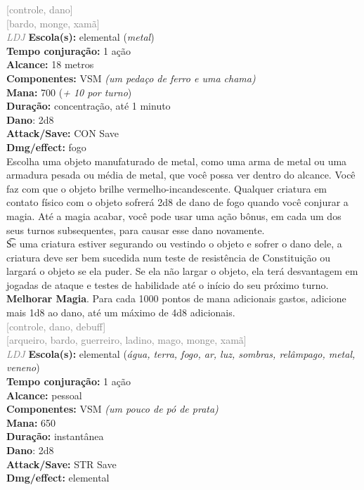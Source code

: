 \documentclass{RPG_Adventure}[2021/10/20]
\begin{document}
{\scriptsize \textcolor{gray}{[controle, dano]\\}}
{\scriptsize \textcolor{gray}{[bardo, monge, xamã]\\}}
{\tiny \textcolor{gray}{\textit{LDJ}}}\jump{}
{\small \t \textbf{Escola(s):} elemental (\textit{metal})\\\t \textbf{Tempo conjuração:} 1 ação\\\t \textbf{Alcance:} 18 metros\\\t \textbf{Componentes:} VSM \textit{(um pedaço de ferro e uma chama)}\\\t \textbf{Mana:} 700 (\textit{+ 10 por turno})\\\t \textbf{Duração:} concentração, até 1 minuto\\\t \textbf{Dano}: 2d8\\\t \textbf{Attack/Save:} CON Save\\\t \textbf{Dmg/effect:} fogo\\}
{\normalsize Escolha uma objeto manufaturado de metal, como uma arma de metal ou uma armadura pesada ou média de metal, que você possa ver dentro do alcance. Você faz com que o objeto brilhe vermelho-incandescente. Qualquer criatura em contato físico com o objeto sofrerá 2d8 de dano de fogo quando você conjurar a magia. Até a magia acabar, você pode usar uma ação bônus, em cada um dos seus turnos subsequentes, para causar esse dano novamente.\\\t Se uma criatura estiver segurando ou vestindo o objeto e sofrer o dano dele, a criatura deve ser bem sucedida num teste de resistência de Constituição ou largará o objeto se ela puder. Se ela não largar o objeto, ela terá desvantagem em jogadas de ataque e testes de habilidade até o início do seu próximo turno.\\\t \textbf{Melhorar Magia}. Para cada 1000 pontos de mana adicionais gastos, adicione mais 1d8 ao dano, até um máximo de 4d8 adicionais.\\}
{\scriptsize \textcolor{gray}{[controle, dano, debuff]\\}}
{\scriptsize \textcolor{gray}{[arqueiro, bardo, guerreiro, ladino, mago, monge, xamã]\\}}
{\tiny \textcolor{gray}{\textit{LDJ}}}\jump{}
{\small \t \textbf{Escola(s):} elemental (\textit{água, terra, fogo, ar, luz, sombras, relâmpago, metal, veneno})\\\t \textbf{Tempo conjuração:} 1 ação\\\t \textbf{Alcance:} pessoal\\\t \textbf{Componentes:} VSM \textit{(um pouco de pó de prata)}\\\t \textbf{Mana:} 650\\\t \textbf{Duração:} instantânea\\\t \textbf{Dano}: 2d8\\\t \textbf{Attack/Save:} STR Save\\\t \textbf{Dmg/effect:} elemental\\}
\end{document}
